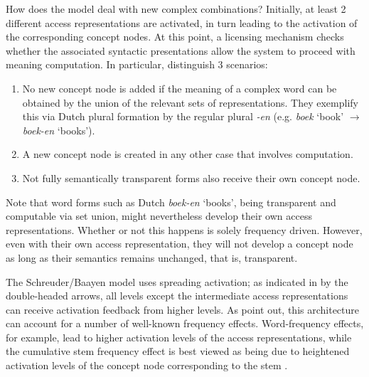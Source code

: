 

How does the model deal with new complex combinations? Initially, at least 2
different access representations are activated, in turn leading to the
activation of the corresponding concept nodes. At this point, a
licensing mechanism checks whether the associated syntactic
presentations allow the system to proceed with meaning computation. In
particular, \citet[137]{SchreuderandBaayen:1995} distinguish 3
scenarios:
\begin{enumerate}
\item No new concept node is added if the meaning of a complex word
  can be obtained by the union of the relevant sets of
  representations. They exemplify this via Dutch plural formation by
  the regular plural \emph{-en} (e.g. \emph{boek} `book' $\rightarrow$ \emph{boek-en} `books').
\item A new concept node is created in any other case that involves computation.
\item Not fully semantically transparent forms also receive their own
  concept node.
\end{enumerate}

Note that word forms such as Dutch \emph{boek-en} `books', being transparent and
computable via set union, might nevertheless develop their own access
representations. \linebreak[3]Whether or not this happens is solely
frequency driven. However, even with their own access representation,
they will not develop a  concept node as long as their semantics
remains unchanged, that is, transparent.

The Schreuder/Baayen model uses spreading activation; as indicated in  by the double-headed
arrows, all levels except the intermediate access representations can
receive activation feedback from higher levels.  As \citeauthor{SchreuderandBaayen:1995} point out, this architecture
can account for a number of well-known frequency effects.
Word-frequency effects, for example, lead to higher activation levels of the
access representations, while the cumulative stem frequency effect is
best viewed as being due to heightened activation levels of the concept
node corresponding to the stem \citep[147]{SchreuderandBaayen:1995}. %

